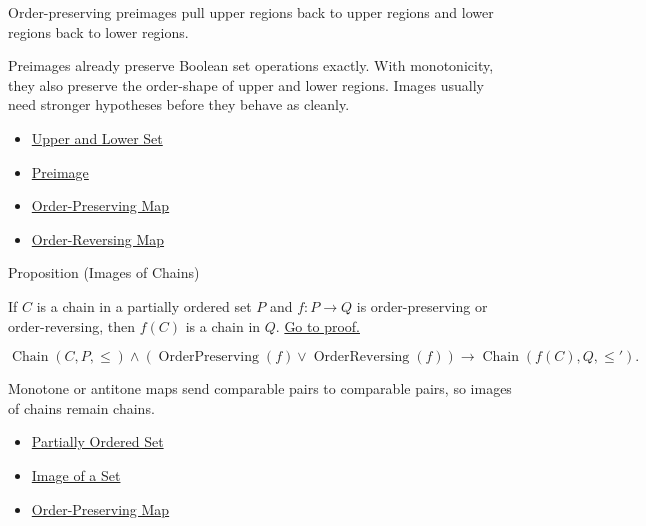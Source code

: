 \begin{remark*}[Interpretation]
Order-preserving preimages pull upper regions back to upper regions and lower
regions back to lower regions.
\end{remark*}

\begin{remark*}[Exposition]
Preimages already preserve Boolean set operations exactly. With monotonicity,
they also preserve the order-shape of upper and lower regions. Images usually
need stronger hypotheses before they behave as cleanly.
\end{remark*}

\begin{dependencies}
\begin{itemize}
  \item \hyperref[def:upper-lower-set]{Upper and Lower Set}
  \item \hyperref[def:preimage]{Preimage}
  \item \hyperref[def:order-preserving-map-ordered-sets]{Order-Preserving Map}
  \item \hyperref[def:order-reversing-map]{Order-Reversing Map}
\end{itemize}
\end{dependencies}

\begin{propositionbox}{Proposition (Images of Chains)}
\begin{proposition}\label{prop:images-chains-monotone}
If $C$ is a chain in a partially ordered set $P$ and
$f:P\to Q$ is order-preserving or order-reversing, then $f(C)$ is a chain in
$Q$.
\hyperref[prf:images-chains-monotone]{Go to proof.}
\end{proposition}
\end{propositionbox}

\begin{remark*}
\[
  \operatorname{Chain}(C,P,\leq)
  \wedge
  (\operatorname{OrderPreserving}(f)\vee\operatorname{OrderReversing}(f))
  \to
  \operatorname{Chain}(f(C),Q,\leq').
\]
\end{remark*}

\begin{remark*}[Interpretation]
Monotone or antitone maps send comparable pairs to comparable pairs, so images
of chains remain chains.
\end{remark*}

\begin{dependencies}
\begin{itemize}
  \item \hyperref[def:partially-ordered-set]{Partially Ordered Set}
  \item \hyperref[def:image-set]{Image of a Set}
  \item \hyperref[def:order-preserving-map-ordered-sets]{Order-Preserving Map}
\end{itemize}
\end{dependencies}
